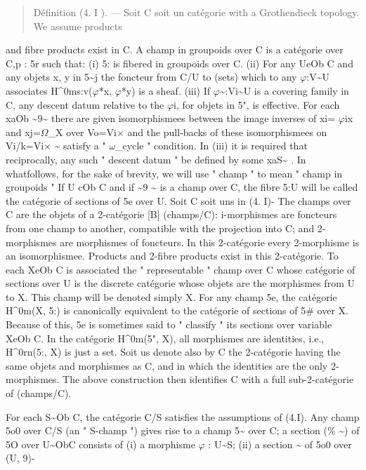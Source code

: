 \documentclass[11pt]{article}
\theoremstyle{plain}
\theoremstyle{definition}
\theoremstyle{remark}
\begin{document}
\begin{quote}D\'efinition (4. I ). --- Soit C soit un cat\'egorie with a Grothendieck topology. We assume products\end{quote}
and fibre products exist in C. A champ in groupoids over C is a cat\'egorie over C,p : 5r such that: (i) 5: is fibered in groupoids over C. (ii) For any UeOb C and any objets x, y in 5\textasciitilde{}j the foncteur from C/U to (sets) which to any $\varphi$:V\textasciitilde{}U associates H\textasciicircum{}0ms:v($\varphi$*x, $\varphi$*y) is a sheaf. (iii) If $\varphi$\textasciitilde{}:Vi\textasciitilde{}U is a covering family in C, any descent datum relative to the $\varphi$i, for objets in 5", is effective. For each xaOb \textasciitilde{}9\textasciitilde{} there are given isomorphismees between the image inverses of xi= $\varphi$ix and xj=$\Omega$\_X over Vo=Vi$\times$ and the pull-backs of these isomorphismees on Vi/k=Vi$\times$ \textasciitilde{} satisfy a " $\omega$\_cycle " condition. In (iii) it is required that reciprocally, any such " descent datum " be defined by some xaS\textasciitilde{} . In whatfollows, for the sake of brevity, we will use " champ " to mean " champ in groupoids " If U cOb C and if \textasciitilde{}9 \textasciitilde{} is a champ over C, the fibre 5:U will be called the cat\'egorie of sections of 5e over U. Soit C soit uns in (4. I)- The champs over C are the objets of a 2-cat\'egorie [B] (champs/C): i-morphismes are foncteurs from one champ to another, compatible with the projection into C; and 2-morphismes are morphismes of foncteurs. In this 2-cat\'egorie every 2-morphisme is an isomorphismee. Products and 2-fibre products exist in this 2-cat\'egorie. To each XeOb C is associated the " representable " champ over C whose cat\'egorie of sections over U is the discrete cat\'egorie whose objets are the morphismes from U to X. This champ will be denoted simply X. For any champ 5e, the cat\'egorie H\textasciicircum{}0m(X, 5:) is canonically equivalent to the cat\'egorie of sections of 5\# over X. Because of this, 5e is sometimes said to " classify " its sections over variable XeOb C. In the cat\'egorie H\textasciicircum{}0m(5", X), all morphismes are identities, i.e., H\textasciicircum{}0rn(5:, X) is just a set. Soit us denote also by C the 2-cat\'egorie having the same objets and morphismes as C, and in which the identities are the only 2-morphismes. The above construction then identifies C with a full sub-2-cat\'egorie of (champs/C).

For each S\textasciitilde{}Ob C, the cat\'egorie C/S satisfies the assumptions of (4.I). Any champ 5o0 over C/S (an " S-champ ") gives rise to a champ 5\textasciitilde{} over C; a section (\% \textasciitilde{}) of 5O over U\textasciitilde{}ObC consists of (i) a morphisme $\varphi$ : U\textasciitilde{}S; (ii) a section \textasciitilde{} of 5o0 over (U, 9)-
\end{document}
